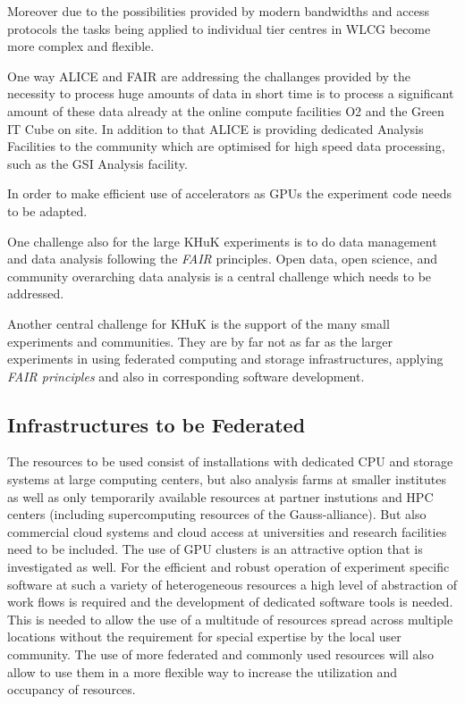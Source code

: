 Moreover due to the possibilities provided by modern bandwidths and access protocols the tasks being applied
to individual tier centres in WLCG become more complex and flexible.

One way ALICE and FAIR are addressing the challanges provided by the necessity to process huge amounts of data
in short time is to process a significant amount of these data already at the online compute facilities O2 and the Green IT Cube on site.
In addition to that ALICE is providing dedicated Analysis Facilities to the community which are optimised for high speed data processing,
such as the GSI Analysis facility.

In order to make efficient use of accelerators as GPUs the experiment code needs to be adapted.

One challenge also for the large KHuK experiments is to do data management and data analysis following the {\em FAIR} principles.
Open data, open science, and community overarching data analysis is a central challenge which needs to be addressed.

Another central challenge for KHuK is the support of the many small experiments and communities.
They are by far not as far as the larger experiments in using federated computing and storage infrastructures,
applying {\em FAIR principles} and also in corresponding software development.

\subsection{Infrastructures to be Federated \label{lab:ketfed} }
The resources to be used consist of installations with dedicated CPU
and storage systems at large computing centers, but also analysis
farms at smaller institutes as well as only temporarily available
resources at partner instutions and HPC centers (including
supercomputing resources of the Gauss-alliance). But also commercial
cloud systems and cloud access at universities and research facilities
need to be included. The use of GPU clusters is an attractive option
that is investigated as well. For the efficient and robust operation
of experiment specific software at such a variety of heterogeneous
resources a high level of abstraction of work flows is required and
the development of dedicated software tools is needed. This is needed
to allow the use of a multitude of resources spread across multiple
locations without the requirement for special expertise by the local user
community. The use of more federated and commonly used resources will
also allow to use them in a more flexible way to increase the
utilization and occupancy of resources. 

